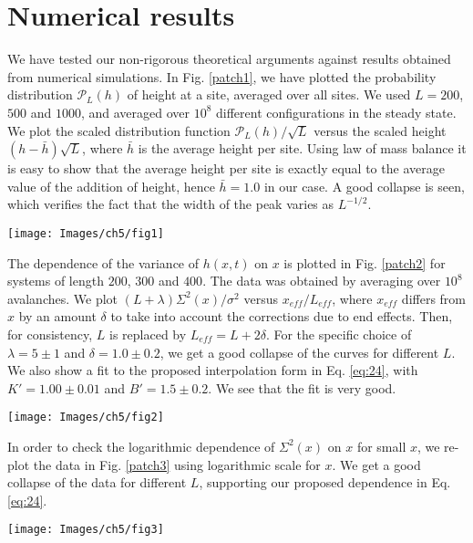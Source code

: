 \documentclass[11pt,a4paper]{book}
\begin{document}
\section{Numerical results}\label{ch4.5}
We have tested  our non-rigorous  theoretical arguments against results 
obtained from numerical simulations. In Fig. \ref{patch1}, we have plotted the 
probability distribution $\mathcal{P}_L(h)$ of height at a site, averaged over all sites. We used $L= 
200$, $500$ and $1000$, and averaged over $10^8$ different configurations 
in the steady state. We plot the scaled distribution function 
$ \mathcal{P}_L(h)/\sqrt{L}$ versus the scaled height $( h - \bar{h}) 
\sqrt{L}$, where $\bar{h}$ is the average height per site. 
Using law of mass balance it is easy to
show that the average height per site is exactly equal to the average value of the 
addition of height, hence $\bar{h}= 1.0$ in our case. A good collapse is seen, which verifies the fact that the width 
of the peak varies as ${L^{-1/2}}$. 
\begin{SCfigure}
\texttt{[image: Images/ch5/fig1]}
\caption{ Scaling collapse of the probability distribution
$\mathcal{P}_L(h)$ of height per site in the steady state for different systems 
of size $200$, $500$ and $1000$. The distribution is well described by a Gaussian of width $0.136$.}
\label{patch1}
\end{SCfigure}  

The  dependence of the variance of $h(x,t)$ on
$x$ is plotted in Fig. \ref{patch2} for systems of length $200$, $300$ and 
$400$. The data was  obtained by averaging over $10^8$ 
avalanches. We plot $( L + \lambda) \Sigma^2(x)/\sigma^2$ versus 
$x_{eff}/L_{eff}$, where $x_{eff}$ differs from $x$ by an amount 
$\delta$ to take into account the corrections due to end effects. Then, for 
consistency, $L$ is replaced by $L_{eff} = L + 2 \delta$.   For 
the specific choice of $\lambda=5 \pm 1$ and $\delta=1.0 \pm 0.2$, we get 
a good collapse of the curves for different $L$.  We also show a fit to 
the proposed interpolation form in Eq. \eqref{eq:24}, with $K'=1.00 \pm
0.01$ and $B'= 1.5 \pm 0.2$. We see that the fit is very good.
\begin{SCfigure}
\texttt{[image: Images/ch5/fig2]}
\caption{ Scaling  collapse of $\Sigma^2(x)/\sigma^2$ at site $x$ 
for systems of different length $L$. }
\label{patch2}
\end{SCfigure}

In order to check the logarithmic dependence of $\Sigma^2(x)$
on $x$ for small $x$, we re-plot the data in Fig. \ref{patch3} using 
logarithmic scale for $x$.  We get a good collapse of the data for 
different $L$, supporting our proposed dependence in Eq. \eqref{eq:24}.
\begin{SCfigure}
\texttt{[image: Images/ch5/fig3]}
\caption{ The same plot in Fig. \ref{patch2} resolved more at the  left boundary of 
the model and taking $x$ axis  in log scale.}
\label{patch3}
\end{SCfigure} 
\end{document}

